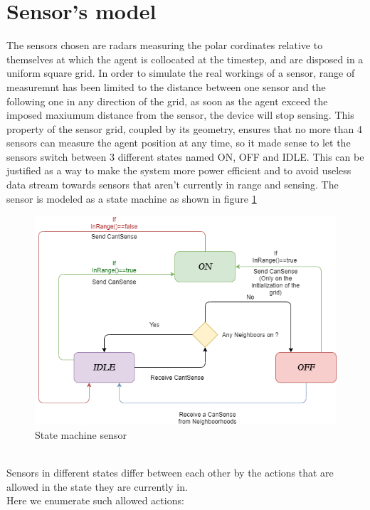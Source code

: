 \documentclass[twocolumn]{article}
\begin{document}
\section*{Sensor's model}
\label{sensor}
The sensors chosen are radars measuring the polar cordinates relative to themselves at which the agent is collocated at the timestep, and
are disposed in a uniform square grid. In order to simulate the real workings of a sensor, range of measuremnt has been limited to the distance
between one sensor and the following one in any direction of the grid, as soon as the agent exceed the imposed maxiumum distance from the sensor,
the device will stop sensing.
This property of the sensor grid, coupled by its geometry, ensures that no more than 4 sensors can measure the agent position at any time,
so it made sense to let the sensors switch between 3 different states named ON, OFF and IDLE. This can be justified as a way to make the system
more power efficient and to avoid useless data stream towards sensors that aren't currently in range and sensing.
The sensor is modeled as a state machine as shown in figure \ref{fig:statemachine}
\\
\begin{figure}[h!]
    \centering
    \includegraphics[width=\columnwidth]{sensor_state_machine.png}
    \caption{State machine sensor}
    \label{fig:statemachine}
\end{figure}
\\
Sensors in different states differ between each other by the actions that are allowed in the state they are currently in.
\\
Here we enumerate such allowed actions:
\end{document}
